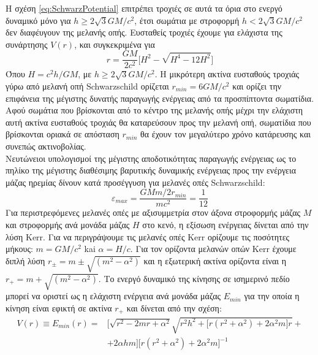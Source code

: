 Η σχέση \ref{eq:SchwarzPotential} επιτρέπει τροχιές σε αυτά τα όρια στο ενεργό δυναμικό μόνο για $ h \geq 2\sqrt{3} GM/c^2$, έτσι σωμάτια με στροφορμή $ h < 2\sqrt{3} GM/c^2$ δεν διαφέυγουν της μελανής οπής. Ευσταθείς τροχιές έχουμε για ελάχιστα της συνάρτησης $V(r)$, και συγκεκριμένα για
\begin{equation}
    r =  \frac{GM}{2c^2} \big[ H^2 - \sqrt{H^4 - 12H^2}     \big]
\end{equation}
Όπου $ H = c^2 h/GM$, με $ h \geq 2\sqrt{3} GM/c^2$. Η μικρότερη ακτίνα ευσταθούς τροχιάς γύρω από μελανή οπή \textlatin{Schwarzschild} ορίζεται $r_{min} = 6GM/c^2$ και ορίζει την επιφάνεια της μέγιστης δυνατής παραγωγής ενέργειας από τα προσπίπτοντα σωματίδια. Αφού σωμάτια που βρίσκονται από το κέντρο της μελανής οπής μέχρι την ελάχιστη αυτή ακτίνα ευσταθούς τροχιάς θα καταρεύσουν προς την μελανή οπή, σωματίδια που βρίσκονται οριακά σε απόσταση $r_{min}$ θα έχουν τον μεγαλύτερο χρόνο κατάρευσης και συνεπώς ακτινοβολίας\cite{AccrPower}.\\
Νευτώνειοι υπολογισμοί της μέγιστης αποδοτικότητας παραγωγής ενέργειας ως το πηλίκο της μέγιστης διαθέσιμης βαρυτικής δυναμικής ενέργειας προς την ενέργεια μάζας ηρεμίας δίνουν κατά προσέγγυση για μελανές οπές \textlatin{Schwarzschild}:
\begin{equation}
    \varepsilon_{max}  =  \frac{GMm/ 2 r_{min}}{mc^2} = \frac{1}{12}
\end{equation}
Για περιστρεφόμενες μελανές οπές με αξισυμμετρία στον άξονα στροφορμής μάζας $Μ$ και στροφορμής ανά μονάδα μάζας $Η$ στο κενό, η εξίσωση ενέργειας δίνεται από την λύση \textlatin{Kerr}. Για να περιγράψουμε τις μελανές οπές \textlatin{Kerr} ορίζουμε τις ποσότητες μήκους: $m = GM/c^2$ kai $\alpha = H/c$. Για τον ορίζοντα μελανών οπών \textlatin{Kerr} έχουμε διπλή λύση $r_{\pm} = m \pm \sqrt{(m^2-\alpha^2) }$ και η εξωτερική ακτίνα ορίζοντα είναι η $r_{+} = m + \sqrt{(m^2-\alpha^2) }$. Το ενεργό δυναμικό της κίνησης σε ισημερινό πεδίο μπορεί να οριστεί ως η ελάχιστη ενέργεια ανά μονάδα μάζας $E_{min}$ για την οποία η κίνηση είναι εφικτή σε ακτίνα $r_{+}$ και δίνεται από την σχέση:
\begin{equation} 
\begin{aligned}
V(r) \equiv E_{min}(r) =  {} &  \Big[\sqrt{r^2 - 2mr + \alpha^2} \sqrt{r^2h^2+ \big[r(r^2+ \alpha^2)+2 \alpha^2m \big]r}  +\\
& + 2 \alpha h m\Big] \Big[ r(r^2+ \alpha^2)+2 \alpha^2m \Big]^{-1}
\end{aligned}
\end{equation} 

